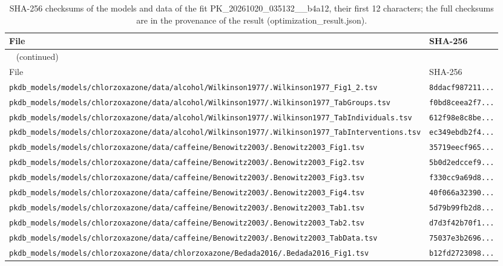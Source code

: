 \documentclass{article}
\begin{document}
\begin{longtable}{ll}
\caption{SHA-256 checksums of the models and data of the fit PK\_20261020\_035132\_\_b4a12, their first 12 characters; the full checksums are in the provenance of the result (optimization\_result.json).}\label{tab:checksums:PK_20261020_035132__b4a12} \\
\toprule
File & SHA-256 \\
\midrule
\endfirsthead
\multicolumn{2}{l}{\small\tablename~\thetable{} (continued)} \\
\toprule
File & SHA-256 \\
\midrule
\endhead
\bottomrule
\endlastfoot
\texttt{pkdb\_models/models/chlorzoxazone/data/alcohol/Wilkinson1977/.Wilkinson1977\_Fig1\_2.tsv} & \texttt{8ddacf987211...} \\
\texttt{pkdb\_models/models/chlorzoxazone/data/alcohol/Wilkinson1977/.Wilkinson1977\_TabGroups.tsv} & \texttt{f0bd8ceea2f7...} \\
\texttt{pkdb\_models/models/chlorzoxazone/data/alcohol/Wilkinson1977/.Wilkinson1977\_TabIndividuals.tsv} & \texttt{612f98e8c8be...} \\
\texttt{pkdb\_models/models/chlorzoxazone/data/alcohol/Wilkinson1977/.Wilkinson1977\_TabInterventions.tsv} & \texttt{ec349ebdb2f4...} \\
\texttt{pkdb\_models/models/chlorzoxazone/data/caffeine/Benowitz2003/.Benowitz2003\_Fig1.tsv} & \texttt{35719eecf965...} \\
\texttt{pkdb\_models/models/chlorzoxazone/data/caffeine/Benowitz2003/.Benowitz2003\_Fig2.tsv} & \texttt{5b0d2edccef9...} \\
\texttt{pkdb\_models/models/chlorzoxazone/data/caffeine/Benowitz2003/.Benowitz2003\_Fig3.tsv} & \texttt{f330cc9a69d8...} \\
\texttt{pkdb\_models/models/chlorzoxazone/data/caffeine/Benowitz2003/.Benowitz2003\_Fig4.tsv} & \texttt{40f066a32390...} \\
\texttt{pkdb\_models/models/chlorzoxazone/data/caffeine/Benowitz2003/.Benowitz2003\_Tab1.tsv} & \texttt{5d79b99fb2d8...} \\
\texttt{pkdb\_models/models/chlorzoxazone/data/caffeine/Benowitz2003/.Benowitz2003\_Tab2.tsv} & \texttt{d7d3f42b70f1...} \\
\texttt{pkdb\_models/models/chlorzoxazone/data/caffeine/Benowitz2003/.Benowitz2003\_TabData.tsv} & \texttt{75037e3b2696...} \\
\texttt{pkdb\_models/models/chlorzoxazone/data/chlorzoxazone/Bedada2016/.Bedada2016\_Fig1.tsv} & \texttt{b12fd2723098...} \\

\end{longtable}
\end{document}
